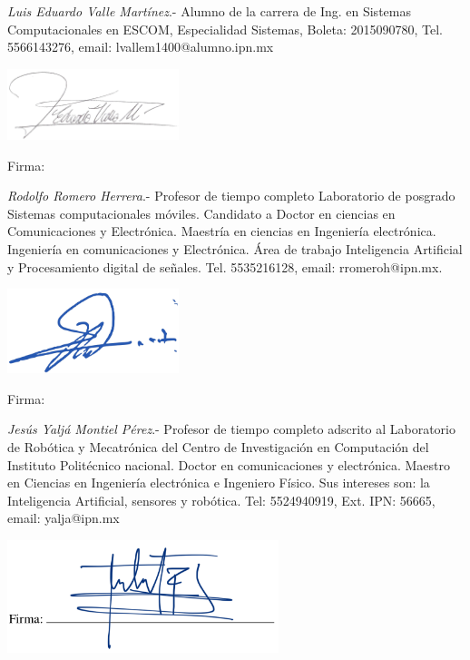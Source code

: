 \begin{multicols*}{2}
	\hfill \break
	\hfill \break
	\justifying
	\textit{Luis Eduardo Valle Martínez}.- Alumno de la carrera de Ing. en Sistemas Computacionales en ESCOM, Especialidad Sistemas, Boleta: 2015090780, Tel. 5566143276, email: lvallem1400@alumno.ipn.mx
	
	\hfill \break
	\hfill \break
	\centering
	\includegraphics[width=5cm]{Imagenes/firma.png}
	
	
	Firma: \hrulefill
	
	\hfill \break
	\hfill \break
	\justifying
	\textit{Rodolfo Romero Herrera}.- Profesor de tiempo completo Laboratorio de posgrado Sistemas computacionales móviles. Candidato a Doctor en ciencias en Comunicaciones y Electrónica. Maestría en ciencias en Ingeniería electrónica. Ingeniería en comunicaciones y Electrónica. Área de trabajo Inteligencia Artificial y Procesamiento digital de señales. Tel. 5535216128, email: rromeroh@ipn.mx.
	
	\hfill \break
	\centering
	\includegraphics[width=5cm]{Imagenes/firma_Rodolfo_Romero.png}
	
	Firma: \hrulefill
	
	\hfill \break
	\hfill \break
	\justifying
	\textit{Jesús Yaljá Montiel Pérez}.- Profesor de tiempo completo adscrito al Laboratorio de Robótica y Mecatrónica del Centro de Investigación en Computación del Instituto Politécnico nacional. Doctor en comunicaciones y electrónica. Maestro en Ciencias en Ingeniería electrónica e Ingeniero Físico. Sus intereses son: la Inteligencia Artificial, sensores y robótica. Tel: 5524940919, Ext. IPN: 56665, email: yalja@ipn.mx
	
	\hfill \break
	\hfill \break
	\centering
	\includegraphics[width=7.9cm]{Imagenes/firma_Jesus_Yalja.png}


\end{multicols*}
